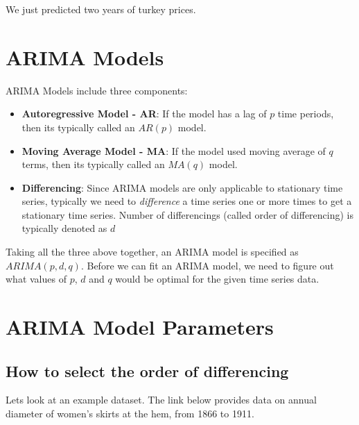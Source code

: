 \documentclass[11pt, letterpaper, twoside]{memoir}\usepackage{knitr}
\begin{document}
We just predicted two years of turkey prices. 

\section{ARIMA Models}

ARIMA Models include three components:

\begin{itemize}

\item \textbf{Autoregressive Model - AR}: If the model has a lag of $p$ time periods, then its typically called an $AR(p)$ model.

\item \textbf{Moving Average Model - MA}: If the model used moving average of $q$ terms, then its typically called an $MA(q)$ model.

\item \textbf{Differencing}: Since ARIMA models are only applicable to stationary time series, typically we need to \emph{difference} a time series one or more times to get a stationary time series. Number of differencings (called order of differencing) is typically denoted as $d$
\end{itemize}

Taking all the three above together, an ARIMA model is specified as $ARIMA(p, d, q)$. Before we can fit an ARIMA model, we need to figure out what values of $p$, $d$ and $q$ would be optimal for the given time series data.

\section{ARIMA Model Parameters}

\subsection{How to select the order of differencing}

Lets look at an example dataset. The link below provides data on annual diameter of women's skirts at the hem, from 1866 to 1911.
\end{document}
